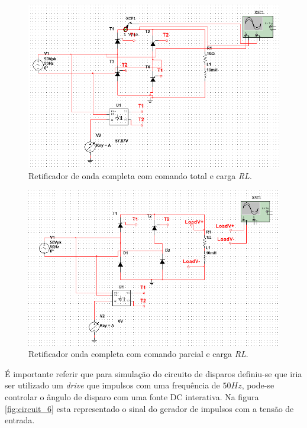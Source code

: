 \documentclass[a4paper,11pt]{article}
\numberwithin{equation}{section}
\begin{document}
\begin{figure}[h]
	\centering
	\includegraphics[keepaspectratio=true, scale=0.5]{img/circuito2}
	\caption{Retificador de onda completa com comando total e carga \textit{RL}.}
	\label{fig:circuit_4}
	\vspace{-0.8em}
\end{figure}

\begin{figure}[h]
	\centering
	\includegraphics[keepaspectratio=true, scale=0.5]{img/circuito3}
	\caption{Retificador onda completa com comando parcial e carga \textit{RL}.}
	\label{fig:circuit_5}
	\vspace{-0.8em}
\end{figure}
\pagebreak 

É importante referir que para simulação do circuito de disparos definiu-se que iria ser utilizado um \textit{drive} que impulsos com uma frequência  de $50Hz$, pode-se controlar o ângulo de  disparo com uma fonte DC interativa. Na figura \ref{fig:circuit_6} esta representado o sinal do gerador de impulsos com a tensão de entrada.
\vspace{17mm}
\end{document}

